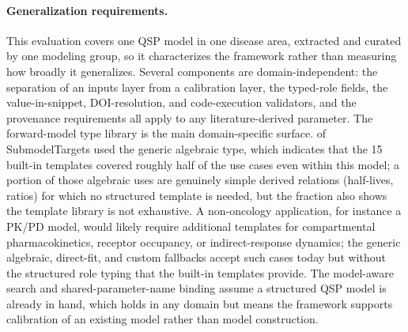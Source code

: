 \paragraph{Generalization requirements.} This evaluation covers one QSP model in one disease area, extracted and curated by one modeling group, so it characterizes the framework rather than measuring how broadly it generalizes. Several components are domain-independent: the separation of an inputs layer from a calibration layer, the typed-role fields, the value-in-snippet, DOI-resolution, and code-execution validators, and the provenance requirements all apply to any literature-derived parameter. The forward-model type library is the main domain-specific surface. \mtAlgebraicPct{} of SubmodelTargets used the generic algebraic type, which indicates that the 15 built-in templates covered roughly half of the use cases even within this model; a portion of those algebraic uses are genuinely simple derived relations (half-lives, ratios) for which no structured template is needed, but the fraction also shows the template library is not exhaustive. A non-oncology application, for instance a PK/PD model, would likely require additional templates for compartmental pharmacokinetics, receptor occupancy, or indirect-response dynamics; the generic algebraic, direct-fit, and custom fallbacks accept such cases today but without the structured role typing that the built-in templates provide. The model-aware search and shared-parameter-name binding assume a structured QSP model is already in hand, which holds in any domain but means the framework supports calibration of an existing model rather than model construction.
